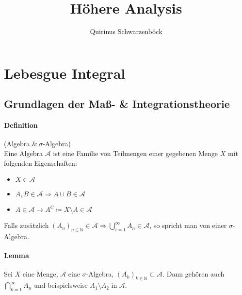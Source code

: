 \documentclass[12pt,a4paper,fleqn]{article}
\author{Quirinus Schwarzenböck}
\title{Höhere Analysis}
\begin{document}
\maketitle
\newpage

\tableofcontents
\newpage

\section{Lebesgue Integral}

\subsection{Grundlagen der Maß- \& Integrationstheorie}

\paragraph{Definition}(Algebra $\&\ \sigma$-Algebra)\\
Eine Algebra $\mathcal{A}$ ist eine Familie von Teilmengen einer gegebenen Menge $\mathit{X}$ mit folgenden Eigenschaften:

\begin{itemize}
\item $\mathit{X} \in \mathcal{A}$
\item $A, B \in \mathcal{A} \Rightarrow A\cup B \in \mathcal{A}$
\item $\mathit{A} \in \mathcal{A} \rightarrow \mathit{A}^\mathrm{C} \coloneqq \mathit{X}\setminus\mathit{A} \in \mathcal{A}$
\end{itemize}
Falls zusätzlich $(\mathit{A}_n)_{n \in \mathbb{N}} \in \mathcal{A} \Rightarrow \bigcup_{i=1}^\infty A_n \in \mathcal{A}$, so spricht man von einer $\sigma$-Algebra.

\paragraph{Lemma}
Sei $\mathit{X}$ eine Menge, $\mathcal{A}$ eine $\sigma$-Algebra, $(\mathit{A}_k)_{k \in \mathbb{N}} \subset \mathcal{A}$. Dann gehören auch $\bigcap^\infty_{k=1} A_n$ und beispielsweise $A_1 \setminus A_2$ in $\mathcal{A}$.
\end{document}
